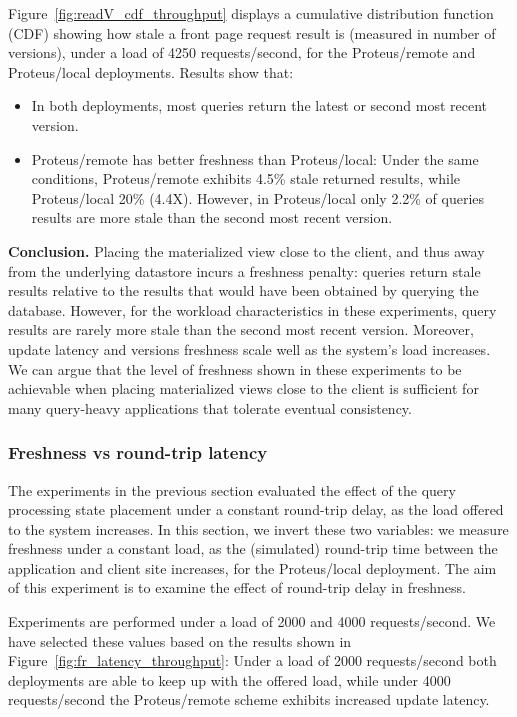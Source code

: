 Figure~\ref{fig:readV_cdf_throughput} displays a cumulative distribution function (CDF) showing how stale a
front page request result is (measured in number of versions),
under a load of 4250 requests/second, for the Proteus/remote and Proteus/local deployments.
Results show that:
\begin{itemize}
  \item In both deployments, most queries return the latest or second most recent version.
  \item Proteus/remote has better freshness than Proteus/local:
  Under the same conditions, Proteus/remote exhibits 4.5\% stale returned results,
  while Proteus/local 20\% (4.4X).
  However, in Proteus/local only 2.2\% of queries results are more stale than the second most recent version.
\end{itemize}

\medskip
\noindent
\textbf{Conclusion.}
Placing the materialized view close to the client, and thus away from the underlying datastore incurs a freshness penalty:
queries return stale results relative to the results that would have been obtained by querying the database.
However, for the workload characteristics in these experiments,
query results are rarely more stale than the second most recent version.
Moreover, update latency and versions freshness scale well as the system's load increases.
We can argue that the level of freshness shown in these experiments to be achievable when placing materialized views close
to the client is sufficient for many query-heavy applications that tolerate eventual consistency.

\subsubsection{Freshness vs round-trip latency}
\label{sec:eval_freshness_rtt}

The experiments in the previous section evaluated the effect of the query processing state placement under a constant
round-trip delay, as the load offered to the system increases.
In this section, we invert these two variables:
we measure freshness under a constant load,
as the (simulated) round-trip time between the application and client site increases,
for the Proteus/local deployment.
The aim of this experiment is to examine the effect of round-trip delay in freshness.

Experiments are performed under a load of 2000 and 4000 requests/second.
We have selected these values based on the results shown in Figure~\ref{fig:fr_latency_throughput}:
Under a load of 2000 requests/second both deployments are able to keep up with the offered load,
while under 4000 requests/second the Proteus/remote scheme exhibits increased update latency.

